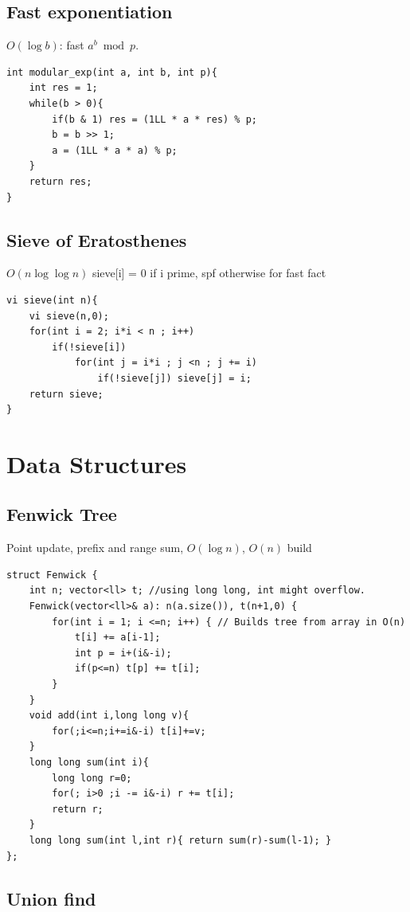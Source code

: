 \documentclass[10pt,a4paper]{article}
\begin{document}
\subsection{Fast exponentiation}

$O(\log b)$: fast $a^b \bmod p$.
\begin{verbatim}
int modular_exp(int a, int b, int p){
    int res = 1;
    while(b > 0){
        if(b & 1) res = (1LL * a * res) % p;
        b = b >> 1;
        a = (1LL * a * a) % p;
    }
    return res;
}
\end{verbatim}

\subsection{Sieve of Eratosthenes}

$O(n \log \log n)$ sieve[i] = 0 if i prime, spf otherwise for fast fact
\begin{verbatim}
vi sieve(int n){
    vi sieve(n,0);
    for(int i = 2; i*i < n ; i++)
        if(!sieve[i])
            for(int j = i*i ; j <n ; j += i)
                if(!sieve[j]) sieve[j] = i;
    return sieve;
}
\end{verbatim}

\section{Data Structures}

\subsection{Fenwick Tree}

Point update, prefix and range sum, $O(\log n)$, $O(n)$ build
\begin{verbatim}
struct Fenwick {
    int n; vector<ll> t; //using long long, int might overflow.
    Fenwick(vector<ll>& a): n(a.size()), t(n+1,0) {
        for(int i = 1; i <=n; i++) { // Builds tree from array in O(n)
            t[i] += a[i-1];
            int p = i+(i&-i);
            if(p<=n) t[p] += t[i];
        }
    }
    void add(int i,long long v){
        for(;i<=n;i+=i&-i) t[i]+=v;
    }
    long long sum(int i){
        long long r=0;
        for(; i>0 ;i -= i&-i) r += t[i];
        return r;
    }
    long long sum(int l,int r){ return sum(r)-sum(l-1); }
};
\end{verbatim}

\subsection{Union find}
\end{document}
